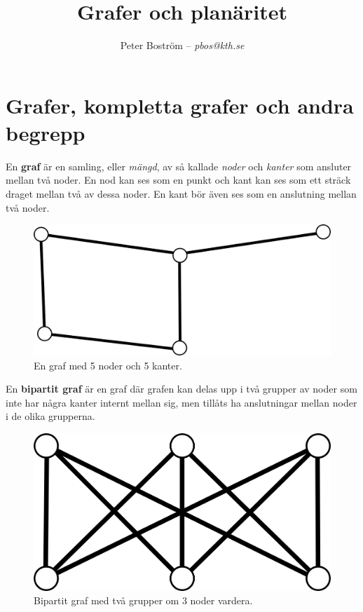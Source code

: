 \documentclass[a4paper,11pt]{article}
\title{Grafer och planäritet}
\author{Peter Boström -- \emph{pbos@kth.se}}
\begin{document}
\maketitle
\pagestyle{fancyplain}

\section*{Grafer, kompletta grafer och andra begrepp}

En \textbf{graf} är en samling, eller \emph{mängd}, av så kallade \emph{noder} och \emph{kanter} som ansluter mellan två noder. En nod kan ses som en punkt och kant kan ses som ett sträck draget mellan två av dessa noder. En kant bör även ses som en anslutning mellan två noder.

\begin{figure}[!ht]
	\begin{center}
		\includegraphics{fig1}
		\caption{En graf med 5 noder och 5 kanter.}
		\label{fig1}
	\end{center}
\end{figure}
\FloatBarrier

En \textbf{bipartit graf} är en graf där grafen kan delas upp i två grupper av noder som inte har några kanter internt mellan sig, men tillåts ha anslutningar mellan noder i de olika grupperna.

\begin{figure}[!ht]
	\begin{center}
		\includegraphics{fig2}
		\caption{Bipartit graf med två grupper om 3 noder vardera.}
		\label{fig2}
	\end{center}
\end{figure}
\FloatBarrier
\end{document}

